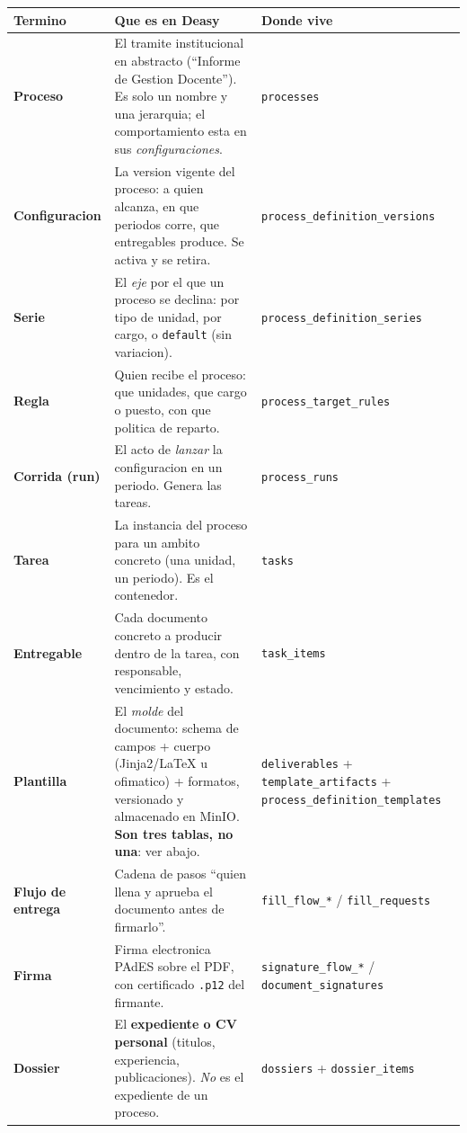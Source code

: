 \documentclass[11pt,a4paper,oneside]{report}
\newcommand{\rt}[1]{\texttt{#1}}
\begin{document}
\begin{center}
\footnotesize
\begin{tabularx}{\textwidth}{@{}P{2.9cm}LP{3.6cm}@{}}
\toprule
\textbf{Termino} & \textbf{Que es en Deasy} & \textbf{Donde vive} \\
\midrule
\textbf{Proceso} &
  El tramite institucional en abstracto (``Informe de Gestion Docente''). Es solo un nombre y
  una jerarquia; el comportamiento esta en sus \emph{configuraciones}. &
  \rt{processes} \\
\textbf{Configuracion} &
  La version vigente del proceso: a quien alcanza, en que periodos corre, que entregables
  produce. Se activa y se retira. &
  \rt{process\_definition\_versions} \\
\textbf{Serie} &
  El \emph{eje} por el que un proceso se declina: por tipo de unidad, por cargo, o
  \rt{default} (sin variacion). &
  \rt{process\_definition\_series} \\
\textbf{Regla} &
  Quien recibe el proceso: que unidades, que cargo o puesto, con que politica de reparto. &
  \rt{process\_target\_rules} \\
\textbf{Corrida (run)} &
  El acto de \emph{lanzar} la configuracion en un periodo. Genera las tareas. &
  \rt{process\_runs} \\
\textbf{Tarea} &
  La instancia del proceso para un ambito concreto (una unidad, un periodo). Es el contenedor. &
  \rt{tasks} \\
\textbf{Entregable} &
  Cada documento concreto a producir dentro de la tarea, con responsable, vencimiento y estado. &
  \rt{task\_items} \\
\textbf{Plantilla} &
  El \emph{molde} del documento: schema de campos + cuerpo (Jinja2/LaTeX u ofimatico) +
  formatos, versionado y almacenado en MinIO. \textbf{Son tres tablas, no una}: ver abajo. &
  \rt{deliverables} + \rt{template\_artifacts} + \rt{process\_definition\_templates} \\
\textbf{Flujo de entrega} &
  Cadena de pasos ``quien llena y aprueba el documento antes de firmarlo''. &
  \rt{fill\_flow\_*} / \rt{fill\_requests} \\
\textbf{Firma} &
  Firma electronica PAdES sobre el PDF, con certificado \rt{.p12} del firmante. &
  \rt{signature\_flow\_*} / \rt{document\_signatures} \\
\textbf{Dossier} &
  El \textbf{expediente o CV personal} (titulos, experiencia, publicaciones). \emph{No} es el
  expediente de un proceso. &
  \rt{dossiers} + \rt{dossier\_items} \\
\bottomrule
\end{tabularx}
\end{center}
\end{document}
